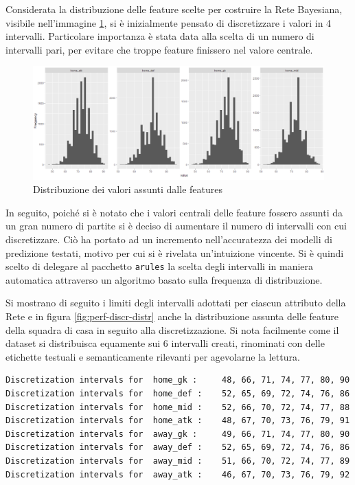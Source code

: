 \documentclass[hidelinks, 12pt]{article}
\begin{document}
Considerata la distribuzione delle feature scelte per costruire la Rete Bayesiana, visibile nell'immagine \ref{fig:perf-scores-distr}, si è inizialmente pensato di discretizzare i valori in 4 intervalli. Particolare importanza è stata data alla scelta di un numero di intervalli pari, per evitare che troppe feature finissero nel valore centrale.

\begin{figure}[H]
	\centering
	\includegraphics[scale=0.47]{images/06_03_score_distr.png}
	\caption[Distribuzione dei valori assunti dalle features]{Distribuzione dei valori assunti dalle features}
	\label{fig:perf-scores-distr}
\end{figure}

In seguito, poiché si è notato che i valori centrali delle feature fossero assunti da un gran numero di partite si è deciso di aumentare il numero di intervalli con cui discretizzare. Ciò ha portato ad un incremento nell'accuratezza dei modelli di predizione testati, motivo per cui si è rivelata un'intuizione vincente. Si è quindi scelto di delegare al pacchetto \texttt{arules} la scelta degli intervalli in maniera automatica attraverso un algoritmo basato sulla frequenza di distribuzione.

Si mostrano di seguito i limiti degli intervalli adottati per ciascun attributo della Rete e in figura \ref{fig:perf-discr-distr} anche la distribuzione assunta delle feature della squadra di casa in seguito alla discretizzazione. Si nota facilmente come il dataset si distribuisca equamente sui 6 intervalli creati, rinominati con delle etichette testuali e semanticamente rilevanti per agevolarne la lettura.

\begin{verbatim}
Discretization intervals for  home_gk :     48, 66, 71, 74, 77, 80, 90
Discretization intervals for  home_def :    52, 65, 69, 72, 74, 76, 86
Discretization intervals for  home_mid :    52, 66, 70, 72, 74, 77, 88
Discretization intervals for  home_atk :    48, 67, 70, 73, 76, 79, 91
Discretization intervals for  away_gk :     49, 66, 71, 74, 77, 80, 90
Discretization intervals for  away_def :    52, 65, 69, 72, 74, 76, 86
Discretization intervals for  away_mid :    51, 66, 70, 72, 74, 77, 89
Discretization intervals for  away_atk :    46, 67, 70, 73, 76, 79, 92
\end{verbatim}
\end{document}

